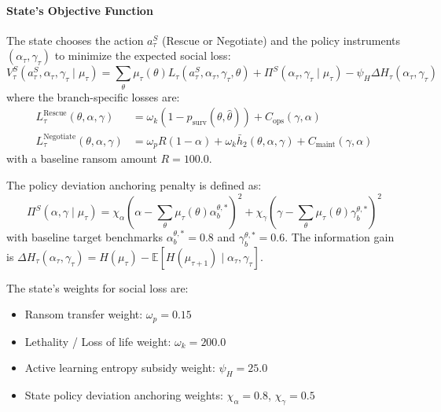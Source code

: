 \documentclass[12pt]{article}
\numberwithin{equation}{section}
\numberwithin{table}{section}
\begin{document}
\paragraph{State's Objective Function}
The state chooses the action $a_\tau^S$ (Rescue or Negotiate) and the policy instruments $(\alpha_\tau, \gamma_\tau)$ to minimize the expected social loss:
\begin{equation}
V^S_{\tau}(a^S_\tau, \alpha_\tau, \gamma_\tau \mid \mu_\tau) = \sum_\theta \mu_\tau(\theta) L_\tau(a_\tau^S, \alpha_\tau, \gamma_\tau, \theta) + \Pi^S(\alpha_\tau, \gamma_\tau \mid \mu_\tau) - \psi_H \Delta H_\tau(\alpha_\tau, \gamma_\tau)
\end{equation}
where the branch-specific losses are:
\begin{align}
L_\tau^{\text{Rescue}}(\theta,\alpha,\gamma) &= \omega_k (1 - p_{\text{surv}}(\theta,\hat{\theta})) + C_{\text{ops}}(\gamma,\alpha) \\
L_\tau^{\text{Negotiate}}(\theta,\alpha,\gamma) &= \omega_p R (1 - \alpha) + \omega_k \bar{h}_2(\theta,\alpha,\gamma) + C_{\text{maint}}(\gamma,\alpha)
\end{align}
with a baseline ransom amount $R = 100.0$.

The policy deviation anchoring penalty is defined as:
\begin{equation}
\Pi^S(\alpha,\gamma \mid \mu_\tau) = \chi_\alpha \left(\alpha - \sum_\theta \mu_\tau(\theta) \alpha_b^{\theta,\ast}\right)^2 + \chi_\gamma \left(\gamma - \sum_\theta \mu_\tau(\theta) \gamma_b^{\theta,\ast}\right)^2
\end{equation}
with baseline target benchmarks $\alpha_b^{\theta,\ast} = 0.8$ and $\gamma_b^{\theta,\ast} = 0.6$. The information gain is $\Delta H_\tau(\alpha_\tau, \gamma_\tau) = H(\mu_\tau) - \mathbb{E}[H(\mu_{\tau+1}) \mid \alpha_\tau, \gamma_\tau]$.

The state's weights for social loss are:
\begin{itemize}
    \item Ransom transfer weight: $\omega_p = 0.15$
    \item Lethality / Loss of life weight: $\omega_k = 200.0$
    \item Active learning entropy subsidy weight: $\psi_H = 25.0$
    \item State policy deviation anchoring weights: $\chi_{\alpha} = 0.8$, $\chi_{\gamma} = 0.5$
\end{itemize}
\end{document}
